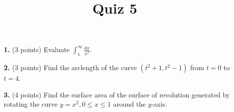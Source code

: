 \documentclass[12pt]{amsart}
\title{Quiz 5}
\begin{document}
\maketitle
\thispagestyle{fancy}

\vskip0.25in
\begin{enumerate}


\item[\textbf{1. }] (3 points) Evaluate $\displaystyle \int_1^\infty \frac{dx}{x^2}.$

\vskip 2in

\item[\textbf{2. }](3 points) Find the arclength of the curve $(t^2 + 1, t^2 - 1)$ from $t = 0$ to $t = 4$.
 
\vskip 2in

\item[\textbf{3. }] (4 points) Find the surface area of the surface of revolution generated by rotating the curve $y = x^2, 0 \le x \le 1$ around the $y$-axis.


\end{enumerate}
\end{document}
